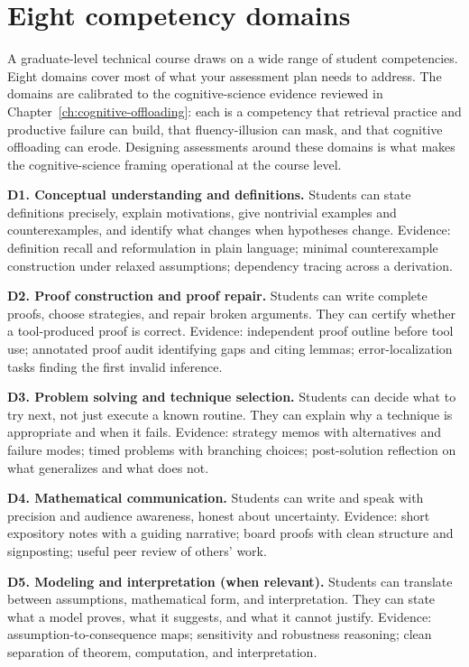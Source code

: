 \documentclass[11pt]{book}
\begin{document}
\section{Eight competency domains}

A graduate-level technical course draws on a wide range of student competencies. Eight domains cover most of what your assessment plan needs to address. The domains are calibrated to the cognitive-science evidence reviewed in Chapter~\ref{ch:cognitive-offloading}: each is a competency that retrieval practice and productive failure can build, that fluency-illusion can mask, and that cognitive offloading can erode. Designing assessments around these domains is what makes the cognitive-science framing operational at the course level.

\textbf{D1. Conceptual understanding and definitions.} Students can state definitions precisely, explain motivations, give nontrivial examples and counterexamples, and identify what changes when hypotheses change. Evidence: definition recall and reformulation in plain language; minimal counterexample construction under relaxed assumptions; dependency tracing across a derivation.

\textbf{D2. Proof construction and proof repair.} Students can write complete proofs, choose strategies, and repair broken arguments. They can certify whether a tool-produced proof is correct. Evidence: independent proof outline before tool use; annotated proof audit identifying gaps and citing lemmas; error-localization tasks finding the first invalid inference.

\textbf{D3. Problem solving and technique selection.} Students can decide what to try next, not just execute a known routine. They can explain why a technique is appropriate and when it fails. Evidence: strategy memos with alternatives and failure modes; timed problems with branching choices; post-solution reflection on what generalizes and what does not.

\textbf{D4. Mathematical communication.} Students can write and speak with precision and audience awareness, honest about uncertainty. Evidence: short expository notes with a guiding narrative; board proofs with clean structure and signposting; useful peer review of others' work.

\textbf{D5. Modeling and interpretation (when relevant).} Students can translate between assumptions, mathematical form, and interpretation. They can state what a model proves, what it suggests, and what it cannot justify. Evidence: assumption-to-consequence maps; sensitivity and robustness reasoning; clean separation of theorem, computation, and interpretation.
\end{document}
